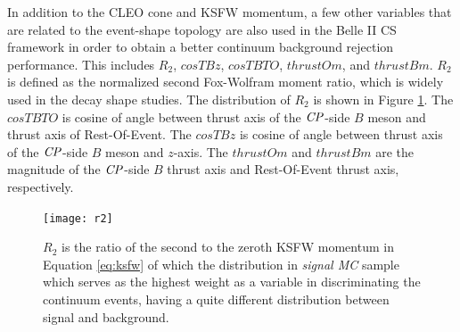 In addition to the CLEO cone and KSFW momentum, a few other variables that are related to the event-shape topology are also used in the Belle II CS framework in order to obtain a better continuum background rejection performance. 
This includes $R_2$, $cosTBz$, $cosTBTO$, $thrustOm$, and $thrustBm$.
$R_2$ is defined as the normalized second Fox-Wolfram moment ratio, which is widely used in the decay shape studies. The distribution of $R_2$ is shown in Figure \ref{fig:R2}.
The $cosTBTO$ is cosine of angle between thrust axis of the $\it{CP}$-side $B$ meson and thrust axis of Rest-Of-Event.
The $cosTBz$ is cosine of angle between thrust axis of the $\it{CP}$-side $B$ meson and $z$-axis.
The $thrustOm$ and $thrustBm$ are the magnitude of the $\it{CP}$-side $B$ thrust axis and Rest-Of-Event thrust axis, respectively. 


 


\begin{figure}[htpb]
	\centering
	\texttt{[image: r2]}
	\caption{$R_2$ is the ratio of the second to the zeroth KSFW momentum in Equation \ref{eq:ksfw} of which the distribution in \textit{signal MC} sample which serves as the highest weight as a variable in discriminating the continuum events, having a quite different distribution between signal and background.}
	\label{fig:R2}
\end{figure}

